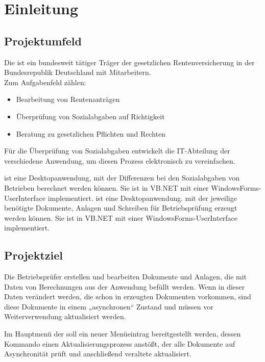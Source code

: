 \section{Einleitung}
\label{sec:Einleitung}


\subsection{Projektumfeld} 
\label{sec:Projektumfeld}

Die \DRV ist ein bundesweit tätiger Träger der gesetzlichen Rentenversicherung in der Bundesrepublik Deutschland
mit  Mitarbeitern.\\
Zum Aufgabenfeld zählen:
\begin{itemize}
	\item Bearbeitung von Rentenanträgen
	\item Überprüfung von Sozialabgaben auf Richtigkeit
	\item Beratung zu gesetzlichen Pflichten und Rechten
\end{itemize}

Für die Überprüfung von Sozialabgaben entwickelt die IT-Abteilung der \DRV verschiedene Anwendung, um diesen Prozess elektronisch zu vereinfachen.

\CBPNB ist eine Desktopanwendung, mit der Differenzen bei den Sozialabgaben von Betrieben berechnet werden können. Sie ist in VB.NET mit einer WindowsForms-UserInterface implementiert.
\CBPAD ist eine Desktopanwendung. mit der jeweilige benötigte Dokumente, Anlagen und Schreiben für Betriebsprüfung erzeugt werden können. Sie ist in VB.NET mit einer WindowsForms-UserInterface implementiert.

\subsection{Projektziel} 
\label{sec:Projektziel}

Die Betriebsprüfer erstellen und bearbeiten Dokumente und Anlagen, die mit Daten von Berechnungen aus der Anwendung \CBPNB befüllt werden. Wenn in dieser Daten verändert werden, die schon in erzeugten Dokumenten vorkommen, sind diese Dokumente in einem „asynchronen“ Zustand und müssen vor Weiterverwendung aktualisiert werden.

Im Hauptmenü der \CBPAD soll ein neuer Menüeintrag bereitgestellt werden, dessen Kommando einen Aktualisierungsprozess anstößt, der alle Dokumente auf Asynchronität prüft und anschließend veraltete aktualisiert.

